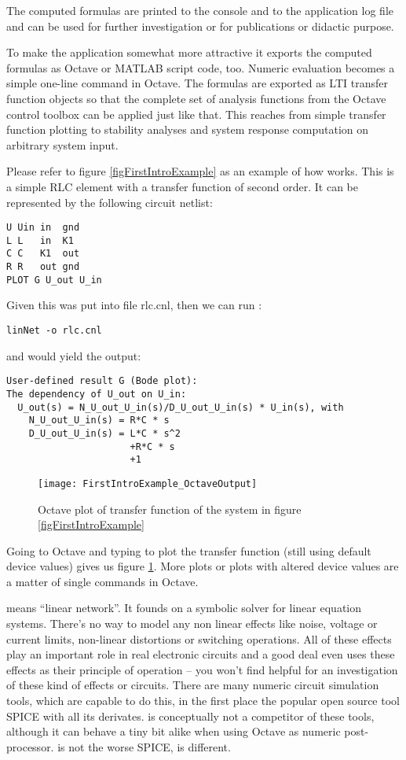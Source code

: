 The computed formulas are printed to the console and to the application
log file and can be used for further investigation or for publications or
didactic purpose.

To make the application somewhat more attractive it exports the computed
formulas as Octave or MATLAB script code, too. Numeric evaluation becomes
a simple one-line command in Octave. The formulas are exported as LTI
transfer function objects so that the complete set of analysis functions
from the Octave control toolbox can be applied just like that. This
reaches from simple transfer function plotting to stability analyses and
system response computation on arbitrary system input.

Please refer to figure \ref{figFirstIntroExample} as an example
of how \linnet{} works. This is a simple RLC element with a transfer
function of second order. It can be represented by the following circuit
netlist:
\begin{verbatim}
U Uin in  gnd
L L   in  K1
C C   K1  out
R R   out gnd
PLOT G U_out U_in
\end{verbatim}
Given this was put into file rlc.cnl, then we can run \linnet{}:
\begin{verbatim}
linNet -o rlc.cnl
\end{verbatim}
and would yield the output:
\begin{verbatim}
User-defined result G (Bode plot):
The dependency of U_out on U_in:
  U_out(s) = N_U_out_U_in(s)/D_U_out_U_in(s) * U_in(s), with
    N_U_out_U_in(s) = R*C * s
    D_U_out_U_in(s) = L*C * s^2
                      +R*C * s
                      +1
\end{verbatim}

\begin{figure}
\centering
\texttt{[image: FirstIntroExample\_OctaveOutput]}
\caption{Octave plot of transfer function of the system in figure
\ref{figFirstIntroExample}}
\label{figFirstIntroExample_OctaveOutput}
\end{figure}

Going to Octave and typing  to plot the transfer function (still
using default device values) gives us figure
\ref{figFirstIntroExample_OctaveOutput}. More plots or plots with altered
device values are a matter of single commands in Octave.

\linnet{} means ``linear network''. It founds on a symbolic solver for
linear equation systems. There's no way to model any non linear effects
like noise, voltage or current limits, non-linear distortions or switching
operations. All of these effects play an important role in real electronic
circuits and a good deal even uses these effects as their principle of
operation -- you won't find \linnet{} helpful for an investigation of
these kind of effects or circuits. There are many numeric circuit
simulation tools, which are capable to do this, in the first place the
popular open source tool SPICE with all its derivates. \linnet{} is
conceptually not a competitor of these tools, although it can behave a
tiny bit alike when using Octave as numeric post-processor. \linnet{} is
not the worse SPICE, \linnet{} is different.

